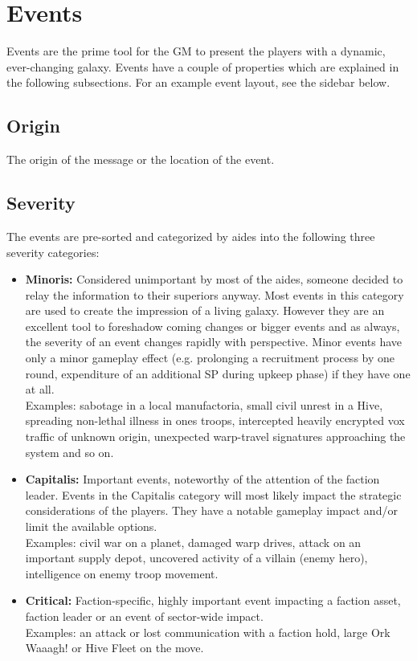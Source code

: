 \section{Events}
Events are the prime tool for the GM to present the players with a dynamic, ever-changing galaxy. Events have a couple of properties which are explained in the following subsections.
For an example event layout, see the sidebar below.

\subsection{Origin}
The origin of the message or the location of the event.

\subsection{Severity}
The events are pre-sorted and categorized by aides into the following three severity categories:
\begin{itemize}
	\item \textbf{Minoris:} Considered unimportant by most of the aides, someone decided to relay the information to their superiors anyway. Most events in this category are used to create the impression of a living galaxy. However they are an excellent tool to foreshadow coming changes or bigger events and as always, the severity of an event changes rapidly with perspective. Minor events have only a minor gameplay effect (e.g. prolonging a recruitment process by one round, expenditure of an additional SP during upkeep phase) if they have one at all.\\
	Examples: sabotage in a local manufactoria, small civil unrest in a Hive, spreading non-lethal illness in ones troops, intercepted heavily encrypted vox traffic of unknown origin, unexpected warp-travel signatures approaching the system and so on.
	\item \textbf{Capitalis:} Important events, noteworthy of the attention of the faction leader. Events in the Capitalis category will most likely impact the strategic considerations of the players. They have a notable gameplay impact and/or limit the available options.\\
	Examples: civil war on a planet, damaged warp drives, attack on an important supply depot, uncovered activity of a villain (enemy hero), intelligence on enemy troop movement.
	\item \textbf{Critical:} Faction-specific, highly important event impacting a faction asset, faction leader or an event of sector-wide impact.\\
	Examples: an attack or lost communication with a faction hold, large Ork Waaagh! or Hive Fleet on the move.
\end{itemize}

